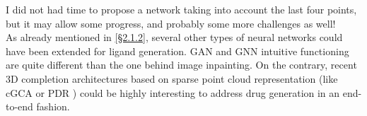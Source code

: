 \documentclass{article}
\begin{document}
I did not had time to propose a network taking into account the last four points, but it may allow some progress, and probably some more challenges as well! \\

As already mentioned in \hyperref[sec:pbstat]{[\S2.1.2]}, several other types of neural networks could have been extended for ligand generation. GAN and GNN intuitive functioning are quite different than the one behind image inpainting. On the contrary, recent 3D completion architectures based on sparse point cloud representation \cite{ProtRepr} (like cGCA \cite{cGCA} or PDR \cite{PDR}) could be highly interesting to address drug generation in an end-to-end fashion.

\clearpage

\printbibliography
\end{document}
